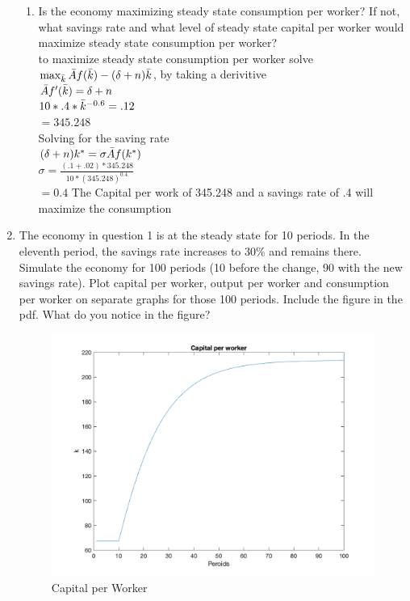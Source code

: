 \documentclass[12pt,oneside,reqno]{amsart}
\begin{document}
\begin{enumerate}
\begin{enumerate}
        \item Is the economy maximizing steady state consumption per worker? If not, what savings rate and what level of steady state capital per worker would maximize steady state consumption per worker?\\
        to maximize steady state consumption per worker solve\\ $\max_{\Bar{k}} \Bar{A}f(\Bar{k})-(\delta+n)\Bar{k}$, by taking a derivitive\\
        $\Bar{A}f'(\Bar{k})=\delta+n$\\
        $10*.4*\Bar{k}^{-0.6}=.12$\\
        $=345.248$\\
        Solving for the saving rate\\
        $(\delta+n)k^*=\sigma\Bar{A}f(k^*)$\\
        $\sigma = \frac{(.1+.02)*345.248}{10*(345.248)^{0.4}}$\\
        $=0.4$ 
        The Capital per work of 345.248 and a savings rate of .4 will maximize the consumption
    \end{enumerate}
    \item The economy in question 1 is at the steady state for 10 periods. In the eleventh period, the savings rate increases to 30\% and remains there. Simulate the economy for 100 periods (10 before the change, 90 with the new savings rate). Plot capital per worker, output per worker and consumption per worker on separate graphs for those 100 periods. Include the figure in the pdf. What do you notice in the figure?
    \begin{figure}[h]
        \centering
        \includegraphics[width =.5\linewidth]{HW1/pics/HW1_Q2_a.png}
        \caption{Capital per Worker}
    \end{figure}
    \vspace{-.5cm}

\end{enumerate}
\end{document}
